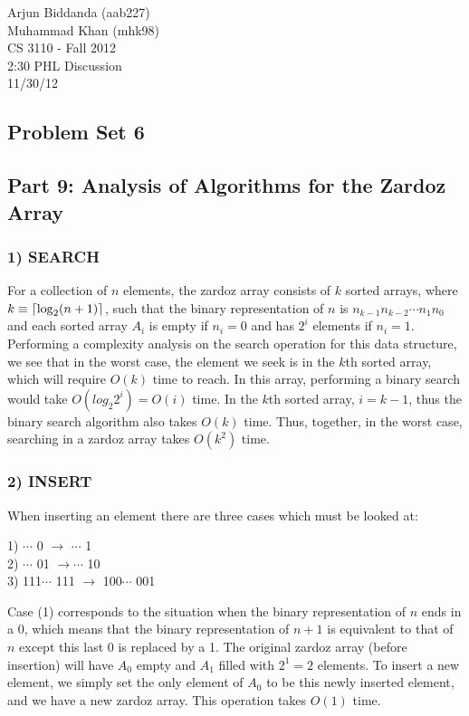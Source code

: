 \documentclass[10pt]{article}
\DeclarePairedDelimiter{\ceil}{\lceil}{\rceil}
\begin{document}
\noindent
Arjun Biddanda (aab227)\\
Muhammad Khan (mhk98)\\
CS 3110 - Fall 2012\\
2:30 PHL Discussion\\
11/30/12\\
\begin{center}
\section*{Problem Set 6}
\subsection*{Part 9: Analysis of Algorithms for the Zardoz Array}
\end{center}
\subsubsection*{1) SEARCH}
For a collection of $n$ elements, the zardoz array consists of $k$ sorted arrays, where $k \equiv
\ceil{\log_2(n+1)}$, such that the binary representation of $n$ is $n_{k-1}n_{k-2}\cdots n_1n_0$ and each sorted array $A_i$ is empty if $n_i = 0$ and has $2^i$ elements if $n_i = 1$. Performing a complexity analysis on the search operation for this data structure, we see that in the worst case, the element we seek is in the $k$th sorted array, which will require $O(k)$ time to reach. In this array, performing a binary search would take $O(log_2 2^i) = O(i)$ time. In the $k$th sorted array, $i = k - 1$, thus the binary search algorithm also takes $O(k)$ time. Thus, together, in the worst case, searching in a zardoz array takes $O(k^2)$ time.
\subsubsection*{2) INSERT}
When inserting an element there are three cases which must be looked at:\\
\begin{center}
1) $\cdots$ 0 $\rightarrow$ $\cdots$ 1\\
2) $\cdots$ 01 $\rightarrow \cdots$ 10\\
3) 111$\cdots$ 111 $\rightarrow$ 100$\cdots$ 001\\
\end{center}
Case (1) corresponds to the situation when the binary representation of $n$ ends in a 0, which means that the binary representation of $n+1$ is equivalent to that of $n$ except this last 0 is replaced by a 1. The original zardoz array (before insertion) will have $A_0$ empty and $A_1$ filled with $2^1 = 2$ elements. To insert a new element, we simply set the only element of $A_0$ to be this newly inserted element, and we have a new zardoz array. This operation takes $O(1)$ time.
\end{document}
